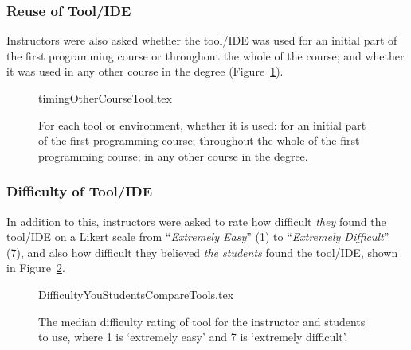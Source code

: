 \documentclass{sig-alternate}
\begin{document}



\subsubsection{Reuse of Tool/IDE}

Instructors were also asked whether the tool/IDE was used for an
initial part of the first programming course or throughout the whole
of the course; and whether it was used in any other course in the
degree (Figure~\ref{fig:toolreuse}). 

\begin{figure}[ht]
\begin{center}
{timingOtherCourseTool.tex}
\end{center}\vskip-18pt
\caption{For each tool or environment, whether it is used: for an initial part of the first programming course; throughout the whole of the first programming course; in any other course in the degree.\label{fig:toolreuse}}
\end{figure}

\subsubsection{Difficulty of Tool/IDE}

In addition to this, instructors were asked to rate how difficult
{\emph{they}} found the tool/IDE on a Likert scale from
``{\emph{Extremely Easy}}'' (1) to ``{\emph{Extremely Difficult}}''
(7), and also how difficult they believed {\emph{the students}} found
the tool/IDE, shown in Figure~\ref{fig:toolhard}.

\begin{figure}
\begin{center}
{DifficultyYouStudentsCompareTools.tex}
\end{center}\vskip-18pt
\caption{The median difficulty rating of tool for the instructor and students to use, where 1 is `extremely easy' and 7 is `extremely difficult'.  %
\label{fig:toolhard}}
\end{figure}
\end{document}

